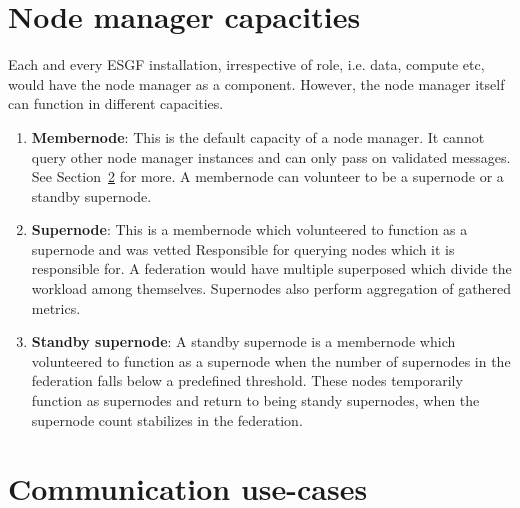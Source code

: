 \documentclass[oneside,12pt]{memoir}
\begin{document}
\section{Node manager capacities}
Each and every ESGF installation, irrespective of role, i.e. data, compute etc, would have the node manager as a component.  However, the node manager itself can function in different capacities. 
\begin{enumerate}
\item \textbf{Membernode}: This is the default capacity of a node manager. It cannot query other node manager instances and can only pass on validated messages. See Section~\ref{commcases} for more. A membernode can volunteer to be a supernode or a standby supernode.
\item \textbf{Supernode}: This is a membernode which volunteered to function as a supernode and was vetted Responsible for querying nodes which it is responsible for.  A federation would have multiple superposed which divide the workload among themselves. Supernodes also perform aggregation of gathered metrics. 
\item \textbf{Standby supernode}: A standby supernode is a membernode which volunteered to function as a supernode when the number of supernodes in the federation falls below a predefined threshold. These nodes temporarily function as supernodes and return to being standy supernodes, when the supernode count stabilizes in the federation.
\end{enumerate}



\section{Communication use-cases}
\label{commcases}
\end{document}
